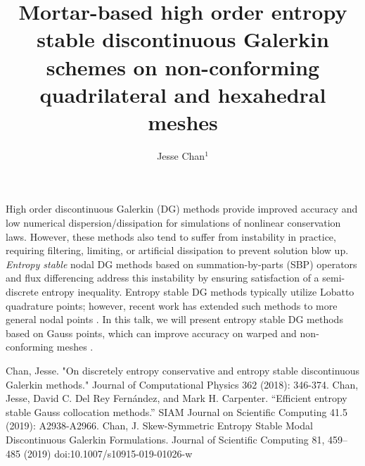 \documentclass[a4paper]{wccm2020-abstract}
\title{Mortar-based high order entropy stable discontinuous Galerkin schemes on non-conforming quadrilateral and hexahedral meshes}
\author{Jesse Chan$^{1}$}
\begin{document}
\thispagestyle{empty}

High order discontinuous Galerkin (DG) methods provide improved accuracy and low numerical dispersion/dissipation for simulations of nonlinear conservation laws.  However, these methods also tend to suffer from instability in practice, requiring filtering, limiting, or artificial dissipation to prevent solution blow up.  \textit{Entropy stable} nodal DG methods based on summation-by-parts (SBP) operators and flux differencing address this instability by ensuring satisfaction of a semi-discrete entropy inequality.  Entropy stable DG methods typically utilize Lobatto quadrature points; however, recent work has extended such methods to more general nodal points \cite{esdg1,esdg3}.  In this talk, we will present entropy stable DG methods based on Gauss points, which can improve accuracy on warped and non-conforming meshes \cite{esdg2}.  

\begin{thebibliography}{99}
 Chan, Jesse. "On discretely entropy conservative and entropy stable discontinuous Galerkin methods." Journal of Computational Physics 362 (2018): 346-374.
  Chan, Jesse, David C. Del Rey Fern\'{a}ndez, and Mark H. Carpenter. ``Efficient entropy stable Gauss collocation methods.'' SIAM Journal on Scientific Computing 41.5 (2019): A2938-A2966.
 Chan, J. Skew-Symmetric Entropy Stable Modal Discontinuous Galerkin Formulations. Journal of Scientific Computing 81, 459–485 (2019) doi:10.1007/s10915-019-01026-w
\end{thebibliography}
\end{document}
